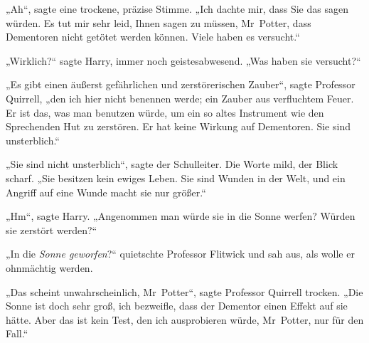 „Ah“, sagte eine trockene, präzise Stimme. „Ich dachte mir, dass Sie das sagen würden. Es tut mir sehr leid, Ihnen sagen zu müssen, Mr~Potter, dass Dementoren nicht getötet werden können. Viele haben es versucht.“

„Wirklich?“ sagte Harry, immer noch geistesabwesend. „Was haben sie versucht?“

„Es gibt einen äußerst gefährlichen und zerstörerischen Zauber“, sagte Professor Quirrell, „den ich hier nicht benennen werde; ein Zauber aus verfluchtem Feuer. Er ist das, was man benutzen würde, um ein so altes Instrument wie den Sprechenden Hut zu zerstören. Er hat keine Wirkung auf Dementoren. Sie sind unsterblich.“

„Sie sind nicht unsterblich“, sagte der Schulleiter. Die Worte mild, der Blick scharf. „Sie besitzen kein ewiges Leben. Sie sind Wunden in der Welt, und ein Angriff auf eine Wunde macht sie nur größer.“

„Hm“, sagte Harry. „Angenommen man würde sie in die Sonne werfen? Würden sie zerstört werden?“

„In die \emph{Sonne geworfen}?“ quietschte Professor Flitwick und sah aus, als wolle er ohnmächtig werden.

„Das scheint unwahrscheinlich, Mr~Potter“, sagte Professor Quirrell trocken. „Die Sonne ist doch sehr groß, ich bezweifle, dass der Dementor einen Effekt auf sie hätte. Aber das ist kein Test, den ich ausprobieren würde, Mr~Potter, nur für den Fall.“

